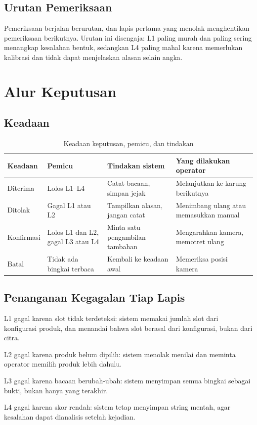 \documentclass[12pt,a4paper,oneside]{report}
\begin{document}
\section{Urutan Pemeriksaan}

Pemeriksaan berjalan berurutan, dan lapis pertama yang menolak menghentikan
pemeriksaan berikutnya. Urutan ini disengaja: L1 paling murah dan paling sering
menangkap kesalahan bentuk, sedangkan L4 paling mahal karena memerlukan
kalibrasi dan tidak dapat menjelaskan alasan selain angka.

\chapter{Alur Keputusan}

\section{Keadaan}

\begin{table}[H]
\caption{Keadaan keputusan, pemicu, dan tindakan}
\label{tab:keadaan}
\begin{tabularx}{\textwidth}{@{}L{2.6cm} L{4.6cm} L{3.4cm} X@{}}
\toprule
\textbf{Keadaan} & \textbf{Pemicu} & \textbf{Tindakan sistem} & \textbf{Yang dilakukan operator} \\
\midrule
Diterima & Lolos L1--L4 & Catat bacaan, simpan jejak & Melanjutkan ke karung berikutnya \\
Ditolak & Gagal L1 atau L2 & Tampilkan alasan, jangan catat & Menimbang ulang atau memasukkan manual \\
Konfirmasi & Lolos L1 dan L2, gagal L3 atau L4 & Minta satu pengambilan tambahan & Mengarahkan kamera, memotret ulang \\
Batal & Tidak ada bingkai terbaca & Kembali ke keadaan awal & Memeriksa posisi kamera \\
\bottomrule
\end{tabularx}
\end{table}

\section{Penanganan Kegagalan Tiap Lapis}

\begin{poin}
  \item L1 gagal karena slot tidak terdeteksi: sistem memakai jumlah slot dari
        konfigurasi produk, dan menandai bahwa slot berasal dari konfigurasi,
        bukan dari citra.
  \item L2 gagal karena produk belum dipilih: sistem menolak menilai dan meminta
        operator memilih produk lebih dahulu.
  \item L3 gagal karena bacaan berubah-ubah: sistem menyimpan semua bingkai
        sebagai bukti, bukan hanya yang terakhir.
  \item L4 gagal karena skor rendah: sistem tetap menyimpan string mentah, agar
        kesalahan dapat dianalisis setelah kejadian.
\end{poin}
\end{document}
